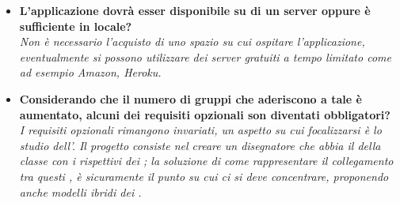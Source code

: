 \begin{itemize}
		   	 \item
	   	 \textbf{L'applicazione dovrà esser disponibile su di un server oppure è sufficiente in locale?\\}
	   	\justifying
	   	 \emph{Non è necessario l'acquisto di uno spazio su cui ospitare l'applicazione, eventualmente si possono utilizzare dei server gratuiti a tempo limitato come ad esempio Amazon, Heroku.\\}
		
		\item
	   	 \textbf{Considerando che il numero di gruppi che aderiscono a tale  è aumentato, alcuni dei requisiti opzionali son diventati obbligatori?\\}
	   	\justifying
	   	 \emph{I requisiti opzionali rimangono invariati, un aspetto su cui focalizzarsi è lo studio dell'. Il progetto consiste nel creare un disegnatore che abbia il  della classe con i rispettivi  dei ; la soluzione di come rappresentare il collegamento tra questi , è sicuramente il punto su cui ci si deve concentrare, proponendo anche modelli ibridi dei .\\}
	   	 \end{itemize}

